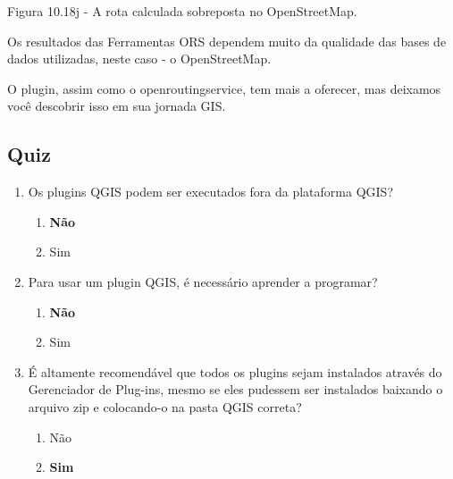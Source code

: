 \documentclass[
]{krantz}
\providecommand{\tightlist}{%
  \setlength{\itemsep}{0pt}\setlength{\parskip}{0pt}}
\begin{document}
Figura 10.18j - A rota calculada sobreposta no OpenStreetMap.

Os resultados das Ferramentas ORS dependem muito da qualidade das bases de dados utilizadas, neste caso - o OpenStreetMap.

O plugin, assim como o openroutingservice, tem mais a oferecer, mas deixamos você descobrir isso em sua jornada GIS.

\hypertarget{quiz-25}{%
\subsection{Quiz}\label{quiz-25}}

\begin{enumerate}
\def\labelenumi{\arabic{enumi}.}
\item
  Os plugins QGIS podem ser executados fora da plataforma QGIS?

  \begin{enumerate}
  \def\labelenumii{\alph{enumii}.}
  \tightlist
  \item
    \textbf{Não}
  \item
    Sim
  \end{enumerate}
\item
  Para usar um plugin QGIS, é necessário aprender a programar?

  \begin{enumerate}
  \def\labelenumii{\alph{enumii}.}
  \tightlist
  \item
    \textbf{Não}
  \item
    Sim
  \end{enumerate}
\item
  É altamente recomendável que todos os plugins sejam instalados através do Gerenciador de Plug-ins, mesmo se eles pudessem ser instalados baixando o arquivo zip e colocando-o na pasta QGIS correta?

  \begin{enumerate}
  \def\labelenumii{\alph{enumii}.}
  \tightlist
  \item
    Não
  \item
    \textbf{Sim}
  \end{enumerate}
\end{enumerate}
\end{document}
